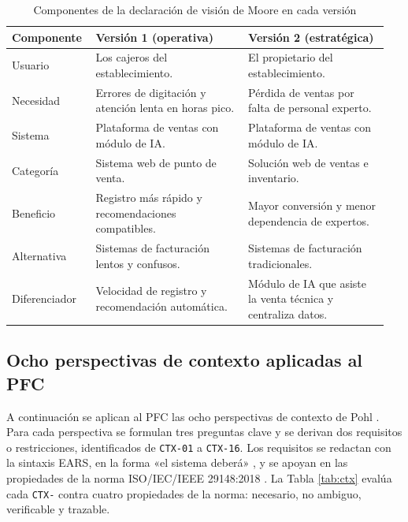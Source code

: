 \documentclass[onecolumn,12pt,a4paper]{IEEEtran}
\begin{document}
\begin{table}[htbp]
\caption{Componentes de la declaraci\'on de visi\'on de Moore en cada versi\'on}
\label{tab:moore}
\centering
\footnotesize
\begin{tabular}{@{}p{0.20\linewidth}p{0.39\linewidth}p{0.36\linewidth}@{}}
\toprule
\textbf{Componente} & \textbf{Versi\'on 1 (operativa)} & \textbf{Versi\'on 2 (estrat\'egica)}\\
\midrule
Usuario & Los cajeros del establecimiento. & El propietario del establecimiento.\\
Necesidad & Errores de digitaci\'on y atenci\'on lenta en horas pico. & P\'erdida de ventas por falta de personal experto.\\
Sistema & Plataforma de ventas con m\'odulo de IA. & Plataforma de ventas con m\'odulo de IA.\\
Categor\'ia & Sistema web de punto de venta. & Soluci\'on web de ventas e inventario.\\
Beneficio & Registro m\'as r\'apido y recomendaciones compatibles. & Mayor conversi\'on y menor dependencia de expertos.\\
Alternativa & Sistemas de facturaci\'on lentos y confusos. & Sistemas de facturaci\'on tradicionales.\\
Diferenciador & Velocidad de registro y recomendaci\'on autom\'atica. & M\'odulo de IA que asiste la venta t\'ecnica y centraliza datos.\\
\bottomrule
\end{tabular}
\end{table}

\subsection{Ocho perspectivas de contexto aplicadas al PFC}
A continuaci\'on se aplican al PFC las ocho perspectivas de contexto de Pohl \cite{pohl2025}. Para cada perspectiva se formulan tres preguntas clave y se derivan dos requisitos o restricciones, identificados de \texttt{CTX-01} a \texttt{CTX-16}. Los requisitos se redactan con la sintaxis EARS, en la forma «el sistema deber\'a» \cite{mavin2009}, y se apoyan en las propiedades de la norma ISO/IEC/IEEE 29148:2018 \cite{iso29148}. La Tabla \ref{tab:ctx} eval\'ua cada \texttt{CTX-} contra cuatro propiedades de la norma: necesario, no ambiguo, verificable y trazable.
\end{document}
